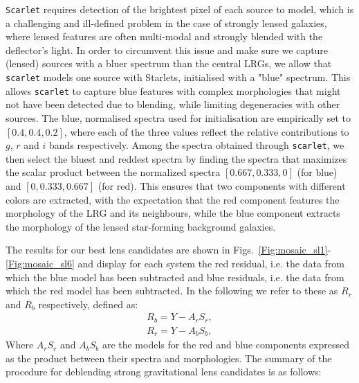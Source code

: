 \documentclass[tradiabstract,twocolumn]{aa}
\begin{document}
{\tt Scarlet} requires detection of the brightest pixel of each source to model, which is a challenging and ill-defined problem in the case of strongly lensed galaxies, where lensed features are often multi-modal and strongly blended with the deflector's light. In order to circumvent this issue and make sure we capture (lensed) sources with a bluer spectrum than the central LRGs, we allow that {\tt scarlet} models one source with Starlets, initialised with a "blue" spectrum. This allows {\tt scarlet} to capture blue features with complex morphologies that might not have been detected due to blending, while limiting degeneracies with other sources. The blue, normalised spectra used for initialisation are empirically set to $[0.4, 0.4, 0.2]$, where each of the three values reflect the relative contributions to $g$, $r$ and $i$ bands respectively. 
Among the spectra obtained through {\tt scarlet}, we then select the bluest and reddest spectra by finding the spectra that maximizes the scalar product between the normalized spectra $[0.667,0.333,0]$ (for blue) and $[0,0.333,0.667]$ (for red). This ensures that two components with different colors are extracted, with the expectation that the red component features the morphology of the LRG and its neighbours, while the blue component extracts the morphology of the lensed star-forming background galaxies. 

The results for our best lens candidates are shown in Figs.~\ref{Fig:mosaic_sl1}-\ref{Fig:mosaic_sl6} and display for each system the red residual, i.e. the data from which the blue model has been subtracted and blue residuals, i.e. the data from which the red model has been subtracted. In the following we refer to these as $R_r$ and $R_b$ respectively, defined as: 
%
\begin{eqnarray}
R_b  =  Y-A_r S_r,\\
R_r  =  Y-A_b S_b,
\end{eqnarray}
%
Where $A_r S_r$ and $A_b S_b$ are the models for the red and blue components expressed as the product between their spectra and morphologies. The summary of the procedure for deblending strong gravitational lens candidates is as follows:
\end{document}
